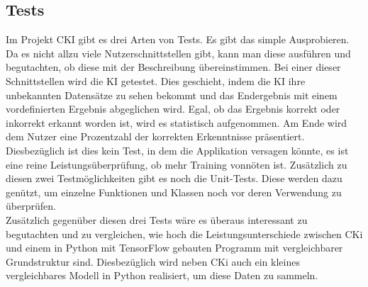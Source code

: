 \subsection{Tests}
\label{sec:DesignTests}
Im Projekt CKI gibt es drei Arten von Tests. Es gibt das simple Ausprobieren. Da es nicht allzu viele Nutzerschnittstellen gibt, kann man diese ausführen und begutachten, ob diese mit der Beschreibung übereinstimmen.
Bei einer dieser Schnittstellen wird die KI getestet. Dies geschieht, indem die KI ihre unbekannten Datensätze zu sehen bekommt und das Endergebnis mit einem vordefinierten Ergebnis abgeglichen wird.
Egal, ob das Ergebnis korrekt oder inkorrekt erkannt worden ist, wird es statistisch aufgenommen. Am Ende wird dem Nutzer eine Prozentzahl der korrekten Erkenntnisse präsentiert. Diesbezüglich ist dies kein Test, in dem die Applikation versagen könnte, es ist eine reine Leistungsüberprüfung, ob mehr Training vonnöten ist.
Zusätzlich zu diesen zwei Testmöglichkeiten gibt es noch die Unit-Tests. Diese werden dazu genützt, um einzelne Funktionen und Klassen noch vor deren Verwendung zu überprüfen.
\\
Zusätzlich gegenüber diesen drei Tests wäre es überaus interessant zu begutachten und zu vergleichen, wie hoch die Leistungsunterschiede zwischen CKi und einem in Python mit TensorFlow gebauten Programm mit vergleichbarer Grundstruktur sind. Diesbezüglich wird neben CKi auch ein kleines vergleichbares Modell in Python realisiert, um diese Daten zu sammeln.
